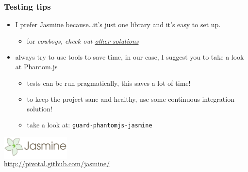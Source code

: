 \documentclass[compress]{beamer}
\begin{document}
\begin{frame}

\frametitle{Testing tips}

\begin{itemize}[<+->]
  \item I prefer Jasmine because\ldots it's just one library and it's easy to set up.
  \begin{itemize}[<+->]
    \item for \em{cowboys}, check out \href{https://github.com/rwldrn/idiomatic.js/\#test-facility}{other solutions}
  \end{itemize}
  \item always try to use tools to save time, in our case, I suggest you to take a look at Phantom.js
  \begin{itemize}[<+->]
    \item tests can be run pragmatically, this saves a lot of time!
    \item to keep the project sane and healthy, use some continuous integration solution!
    \item take a look at: \texttt{guard-phantomjs-jasmine}
  \end{itemize}
\end{itemize}

\begin{flushright}
  \colorbox{white}{\includegraphics[height=1.1cm]{jasmine.png}}
  \\
  \tiny \url{http://pivotal.github.com/jasmine/}
\end{flushright}


\end{frame}
\end{document}
